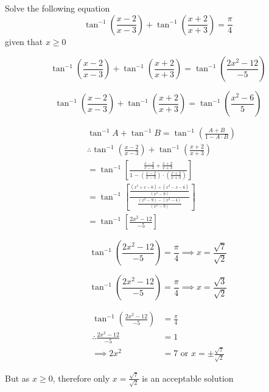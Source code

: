 \documentclass[14pt,fleqn]{extarticle}
\newcommand\xsqtw{ \left(x^2 - 4 \right) }
\newcommand\xsqth{ \left(x^2 - 9 \right)}
\begin{document}
\begin{problem}
	\statement 
    
    Solve the following equation 
    \[ \tan^{-1} \left(\frac{x-2}{x-3} \right) + \tan^{-1} \left(\frac{x+2}{x+3} \right) = \frac\pi{4} \]
    given that $x \geq 0$ 
    
    \begin{step}
  \begin{options} 
     \correct 
       \small\[ \tan^{-1} \left(\frac{x-2}{x-3} \right) + \tan^{-1} \left(\frac{x+2}{x+3} \right) = \tan^{-1} \left( \frac{2x^2 - 12}{-5}\right)\]
     \incorrect
        
        \[ \tan^{-1} \left(\frac{x-2}{x-3} \right) + \tan^{-1} \left(\frac{x+2}{x+3} \right) = \tan^{-1} \left( \frac{x^2 - 6}{5}\right)\]
    \end{options} 
     \reason 
     
     \begin{align}
	&\tan^{-1} A + \tan^{-1} B = \tan^{-1} \left(\frac{A + B}{1-A\cdot B} \right) \\
	&\therefore \tan^{-1} \left(\frac{x-2}{x-3} \right) + \tan^{-1} \left(\frac{x+2}{x+3} \right) \\
	&= \tan^{-1} \left[ \frac{\frac{x-2}{x-3} + \frac{x+2}{x+3}}{1- \left(\frac{x-2}{x-3} \right)\cdot \left(\frac{x+2}{x+3} \right)} \right]  \\
	&= \tan^{-1} \left[ \frac{\frac{\left(x^2+x-6 \right) + \left(x^2 - x - 6 \right)}{\xsqth}}{\frac{\xsqth-\xsqtw}{\xsqth}} \right] \\
	&= \tan^{-1} \left[\frac{2x^2 - 12}{-5} \right]
\end{align}
       
\end{step}     

\begin{step}
  \begin{options} 
     \correct 
       
       \[ \tan^{-1} \left(\frac{2x^2-12}{-5} \right) = \frac\pi{4} \implies x = \frac{\sqrt{7}}{\sqrt{2}} \]
     \incorrect
        
         \[ \tan^{-1} \left(\frac{2x^2-12}{-5} \right) = \frac\pi{4} \implies x = \frac{\sqrt{3}}{\sqrt{2}} \]
    \end{options} 
     \reason 
       
       \begin{align}
       \tan^{-1} \left(\frac{2x^2-12}{-5} \right) &= \frac\pi{4} \\ 
       \therefore \frac{2x^2 - 12}{-5} &= 1 \\ 
       \implies 2x^2 &= 7\text{ or } x = \pm \frac{\sqrt{7}}{\sqrt{2}}
\end{align}

But as $x \geq 0$, therefore only $x = \frac{\sqrt{7}}{\sqrt{2}}$ is an acceptable solution 
\end{step} 
\end{problem} 
\end{document}
